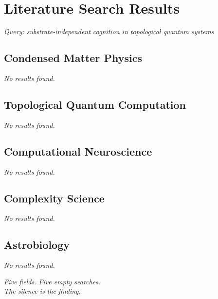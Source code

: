 \section*{Literature Search Results}

\emph{Query: substrate-independent cognition in topological quantum systems}

\subsection*{Condensed Matter Physics}

\emph{No results found.}

\subsection*{Topological Quantum Computation}

\emph{No results found.}

\subsection*{Computational Neuroscience}

\emph{No results found.}

\subsection*{Complexity Science}

\emph{No results found.}

\subsection*{Astrobiology}

\emph{No results found.}


\begin{center}
\textit{Five fields. Five empty searches.\\ The silence is the finding.}
\end{center}
